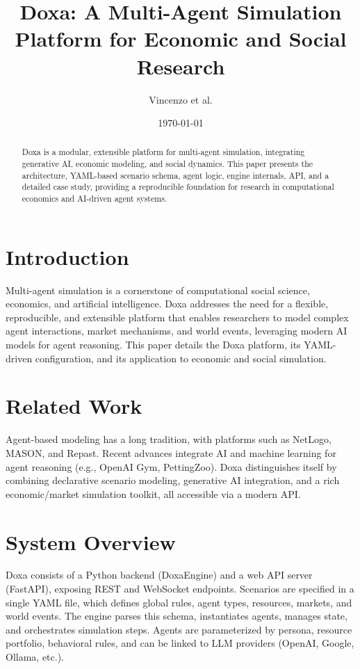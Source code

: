 \documentclass{article}
\title{Doxa: A Multi-Agent Simulation Platform for Economic and Social Research}
\author{Vincenzo et al.}
\date{\today}
\begin{document}
\maketitle





\begin{abstract}
Doxa is a modular, extensible platform for multi-agent simulation, integrating generative AI, economic modeling, and social dynamics. This paper presents the architecture, YAML-based scenario schema, agent logic, engine internals, API, and a detailed case study, providing a reproducible foundation for research in computational economics and AI-driven agent systems.
\end{abstract}

\section{Introduction}
Multi-agent simulation is a cornerstone of computational social science, economics, and artificial intelligence. Doxa addresses the need for a flexible, reproducible, and extensible platform that enables researchers to model complex agent interactions, market mechanisms, and world events, leveraging modern AI models for agent reasoning. This paper details the Doxa platform, its YAML-driven configuration, and its application to economic and social simulation.

\section{Related Work}
Agent-based modeling has a long tradition, with platforms such as NetLogo, MASON, and Repast. Recent advances integrate AI and machine learning for agent reasoning (e.g., OpenAI Gym, PettingZoo). Doxa distinguishes itself by combining declarative scenario modeling, generative AI integration, and a rich economic/market simulation toolkit, all accessible via a modern API.

\section{System Overview}
Doxa consists of a Python backend (DoxaEngine) and a web API server (FastAPI), exposing REST and WebSocket endpoints. Scenarios are specified in a single YAML file, which defines global rules, agent types, resources, markets, and world events. The engine parses this schema, instantiates agents, manages state, and orchestrates simulation steps. Agents are parameterized by persona, resource portfolio, behavioral rules, and can be linked to LLM providers (OpenAI, Google, Ollama, etc.).
\end{document}
